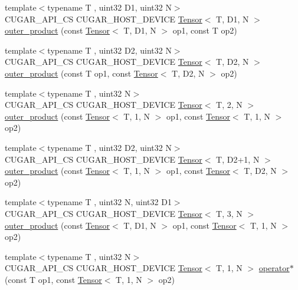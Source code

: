 \begin{DoxyCompactItemize}
\item 
{\footnotesize template$<$typename T , uint32 D1, uint32 N$>$ }\\C\+U\+G\+A\+R\+\_\+\+A\+P\+I\+\_\+\+CS C\+U\+G\+A\+R\+\_\+\+H\+O\+S\+T\+\_\+\+D\+E\+V\+I\+CE \hyperlink{structcugar_1_1_tensor}{Tensor}$<$ T, D1, N $>$ \hyperlink{namespacecugar_abcb3266a7078c0ddffce34f4f5852beb}{outer\+\_\+product} (const \hyperlink{structcugar_1_1_tensor}{Tensor}$<$ T, D1, N $>$ op1, const T op2)
\item 
{\footnotesize template$<$typename T , uint32 D2, uint32 N$>$ }\\C\+U\+G\+A\+R\+\_\+\+A\+P\+I\+\_\+\+CS C\+U\+G\+A\+R\+\_\+\+H\+O\+S\+T\+\_\+\+D\+E\+V\+I\+CE \hyperlink{structcugar_1_1_tensor}{Tensor}$<$ T, D2, N $>$ \hyperlink{namespacecugar_adba86f3dd826f0547a2af557817b08a7}{outer\+\_\+product} (const T op1, const \hyperlink{structcugar_1_1_tensor}{Tensor}$<$ T, D2, N $>$ op2)
\item 
{\footnotesize template$<$typename T , uint32 N$>$ }\\C\+U\+G\+A\+R\+\_\+\+A\+P\+I\+\_\+\+CS C\+U\+G\+A\+R\+\_\+\+H\+O\+S\+T\+\_\+\+D\+E\+V\+I\+CE \hyperlink{structcugar_1_1_tensor}{Tensor}$<$ T, 2, N $>$ \hyperlink{namespacecugar_ab7ff6cecff7379e980468f2962c32121}{outer\+\_\+product} (const \hyperlink{structcugar_1_1_tensor}{Tensor}$<$ T, 1, N $>$ op1, const \hyperlink{structcugar_1_1_tensor}{Tensor}$<$ T, 1, N $>$ op2)
\item 
{\footnotesize template$<$typename T , uint32 D2, uint32 N$>$ }\\C\+U\+G\+A\+R\+\_\+\+A\+P\+I\+\_\+\+CS C\+U\+G\+A\+R\+\_\+\+H\+O\+S\+T\+\_\+\+D\+E\+V\+I\+CE \hyperlink{structcugar_1_1_tensor}{Tensor}$<$ T, D2+1, N $>$ \hyperlink{namespacecugar_a0c5c7465eff221749960051d27c2d3a8}{outer\+\_\+product} (const \hyperlink{structcugar_1_1_tensor}{Tensor}$<$ T, 1, N $>$ op1, const \hyperlink{structcugar_1_1_tensor}{Tensor}$<$ T, D2, N $>$ op2)
\item 
{\footnotesize template$<$typename T , uint32 N, uint32 D1$>$ }\\C\+U\+G\+A\+R\+\_\+\+A\+P\+I\+\_\+\+CS C\+U\+G\+A\+R\+\_\+\+H\+O\+S\+T\+\_\+\+D\+E\+V\+I\+CE \hyperlink{structcugar_1_1_tensor}{Tensor}$<$ T, 3, N $>$ \hyperlink{namespacecugar_a420265d5c4604f1adb56935169b7a772}{outer\+\_\+product} (const \hyperlink{structcugar_1_1_tensor}{Tensor}$<$ T, D1, N $>$ op1, const \hyperlink{structcugar_1_1_tensor}{Tensor}$<$ T, 1, N $>$ op2)
\item 
{\footnotesize template$<$typename T , uint32 N$>$ }\\C\+U\+G\+A\+R\+\_\+\+A\+P\+I\+\_\+\+CS C\+U\+G\+A\+R\+\_\+\+H\+O\+S\+T\+\_\+\+D\+E\+V\+I\+CE \hyperlink{structcugar_1_1_tensor}{Tensor}$<$ T, 1, N $>$ \hyperlink{namespacecugar_a512b8bd8923b7f7e958aee854ff19d70}{operator$\ast$} (const T op1, const \hyperlink{structcugar_1_1_tensor}{Tensor}$<$ T, 1, N $>$ op2)

\end{DoxyCompactItemize}

